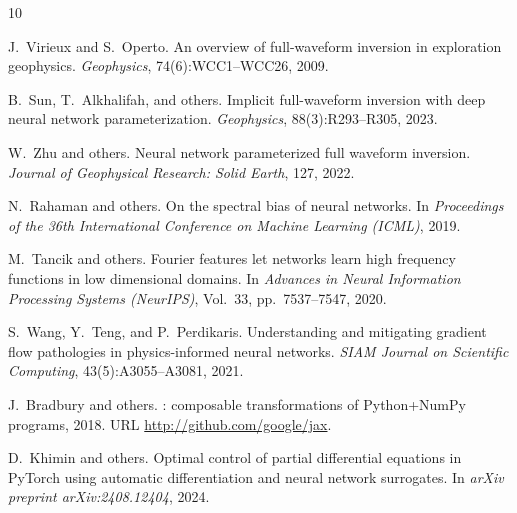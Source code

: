 \documentclass[11pt]{article}
\begin{document}
\begin{thebibliography}{10}

J.~Virieux and S.~Operto.
\newblock An overview of full-waveform inversion in exploration geophysics.
\newblock \emph{Geophysics}, 74(6):WCC1--WCC26, 2009.

B.~Sun, T.~Alkhalifah, and others.
\newblock Implicit full-waveform inversion with deep neural network parameterization.
\newblock \emph{Geophysics}, 88(3):R293--R305, 2023.

W.~Zhu and others.
\newblock Neural network parameterized full waveform inversion.
\newblock \emph{Journal of Geophysical Research: Solid Earth}, 127, 2022.

N.~Rahaman and others.
\newblock On the spectral bias of neural networks.
\newblock In \emph{Proceedings of the 36th International Conference on Machine Learning (ICML)}, 2019.

M.~Tancik and others.
\newblock Fourier features let networks learn high frequency functions in low dimensional domains.
\newblock In \emph{Advances in Neural Information Processing Systems (NeurIPS)}, Vol.~33, pp.~7537--7547, 2020.

S.~Wang, Y.~Teng, and P.~Perdikaris.
\newblock Understanding and mitigating gradient flow pathologies in physics-informed neural networks.
\newblock \emph{SIAM Journal on Scientific Computing}, 43(5):A3055--A3081, 2021.

J.~Bradbury and others.
: composable transformations of {P}ython+{N}um{P}y programs, 2018.
\newblock URL \url{http://github.com/google/jax}.

D.~Khimin and others.
\newblock Optimal control of partial differential equations in {PyTorch} using automatic differentiation and neural network surrogates.
\newblock In \emph{arXiv preprint arXiv:2408.12404}, 2024.

\end{thebibliography}
\end{document}
